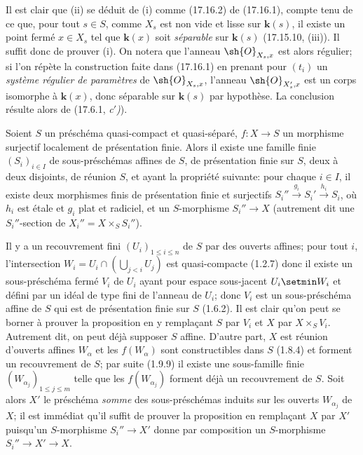 Il est clair que (ii) se déduit de (i) comme (17.16.2) de (17.16.1), compte tenu de ce que, pour tout $s\in S$, comme $X_s$ est non vide et lisse sur $\boldsymbol{k}(s)$, il existe un point fermé $x\in X_s$ tel que $\boldsymbol{k}(x)$ soit \emph{séparable} sur $\boldsymbol{k}(s)$ (17.15.10, (iii)). Il suffit donc de prouver (i). On notera que l'anneau $\sh{O}_{X_s,x}$ est alors régulier; si l'on répète la construction faite dans (17.16.1) en prenant pour $(t_i)$ un \emph{système régulier de paramètres} de $\sh{O}_{X_s,x}$, l'anneau $\sh{O}_{X'_s,x}$ est un corps isomorphe à $\boldsymbol{k}(x)$, donc séparable sur $\boldsymbol{k}(s)$ par hypothèse. La conclusion résulte alors de (17.6.1, \emph{c$'$)}).

\begin{proposition}[17.16.4]
\label{IV.17.16.4}
Soient $S$ un préschéma quasi-compact et quasi-séparé, $f:X\to S$ un morphisme surjectif localement de présentation finie. Alors il existe une famille finie $(S_i)_{i\in I}$
de sous-préschémas affines de $S$, de présentation finie sur $S$, deux à deux disjoints, de réunion $S$, et ayant la propriété suivante: pour chaque $i\in I$, il existe deux morphismes finis de présentation finie et surjectifs $S_i''\xrightarrow{g_i}S_i'\xrightarrow{h_i}S_i$, où $h_i$ est étale et $g_i$ plat et radiciel, et un $S$-morphisme $S_i''\to X$ \textup{(autrement dit une} $S_i''$-section \textup{de} $X_i''=X\times_S S_i''$\textup{)}.
\end{proposition}

Il y a un recouvrement fini $(U_i)_{1\leq i\leq n}$ de $S$ par des ouverts affines; pour tout $i$, l'intersection $W_i=U_i\cap\left(\bigcup_{j<i}U_j\right)$ est quasi-compacte (1.2.7) donc il existe un sous-préschéma fermé $V_i$ de $U_i$ ayant pour espace sous-jacent $U_i\setmin W_i$ et défini par un idéal de type fini de l'anneau de $U_i$; donc $V_i$ est un sous-préschéma affine de $S$ qui est de présentation finie sur $S$ (1.6.2). Il est clair qu'on peut se borner à prouver la proposition en y remplaçant $S$ par $V_i$ et $X$ par $X\times_S V_i$. Autrement dit, on peut déjà supposer $S$ affine. D'autre part, $X$ est réunion d'ouverts affines $W_\alpha$ et les $f(W_\alpha)$ sont constructibles dans $S$ (1.8.4) et forment un recouvrement de $S$; par suite (1.9.9) il existe une sous-famille finie $(W_{\alpha_j})_{1\leq j\leq m}$ telle que les $f(W_{\alpha_j})$ forment déjà un recouvrement de $S$. Soit alors $X'$ le préschéma \emph{somme} des sous-préschémas induits sur les ouverts $W_{\alpha_j}$ de $X$; il est immédiat qu'il suffit de prouver la proposition en remplaçant $X$ par $X'$ puisqu'un $S$-morphisme $S_i''\to X'$ donne par composition un $S$-morphisme $S_i''\to X'\to X$.

